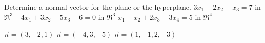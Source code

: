 
\begin{Exercise}[
name={},
title={}, 
difficulty=0,
origin={\cite{SM}}]
Determine a normal vector for the plane or the hyperplane.
\Question $3x_1-2x_2+x_3=7$ in $\Re^3$
\Question $-4x_1+3x_2-5x_3-6=0$ in $\Re^3$
\Question $x_1-x_2+2x_3-3x_4=5$ in $\Re^4$
\end{Exercise}

\begin{Answer}
\Question $\vec{n}=(3,-2,1)$
\Question $\vec{n}=(-4,3,-5)$
\Question $\vec{n}=(1,-1,2,-3)$
\end{Answer}
